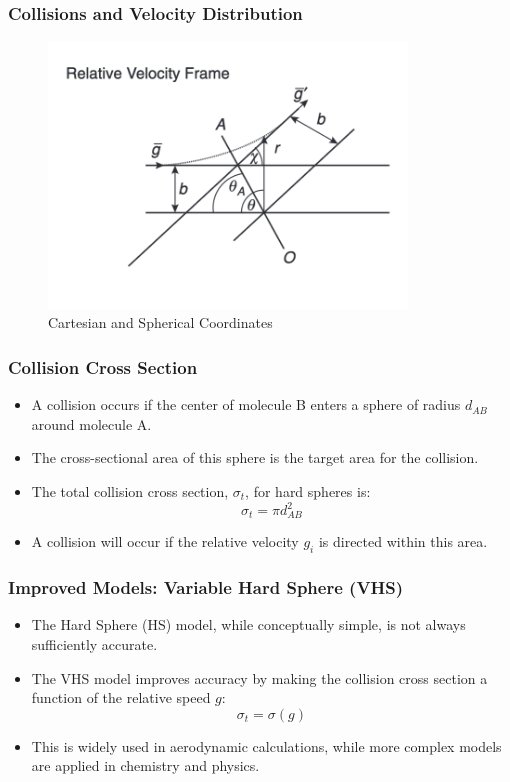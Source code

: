 \documentclass{beamer}
\begin{document}
\begin{frame}
\frametitle{Collisions and Velocity Distribution}
\begin{figure}
        \centering
        \includegraphics[width=0.85\textwidth]{collision_relative.png}
        \caption{Cartesian and Spherical Coordinates}
    \end{figure}
    \end{frame}
\begin{frame}
\frametitle{Collision Cross Section}
\begin{itemize}
    \item A collision occurs if the center of molecule B enters a sphere of radius $d_{AB}$ around molecule A.
    \item The cross-sectional area of this sphere is the target area for the collision.
    \item The total collision cross section, $\sigma_t$, for hard spheres is:
    \[
    \sigma_t = \pi d_{AB}^2
    \]
    \item A collision will occur if the relative velocity $g_i$ is directed within this area.
\end{itemize}
\end{frame}

\begin{frame}
\frametitle{Improved Models: Variable Hard Sphere (VHS)}
\begin{itemize}
    \item The Hard Sphere (HS) model, while conceptually simple, is not always sufficiently accurate.
    \item The VHS model improves accuracy by making the collision cross section a function of the relative speed $g$:
    \[
    \sigma_t = \sigma(g)
    \]
    \item This is widely used in aerodynamic calculations, while more complex models are applied in chemistry and physics.
\end{itemize}
\end{frame}
\end{document}
